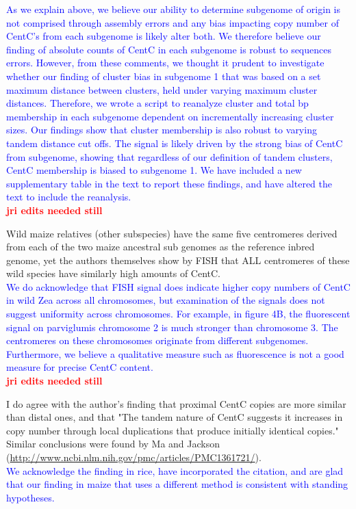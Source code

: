 \documentclass[]{article}
\newcommand{\res}[1]{\noindent \textcolor{blue}{{#1}} \\}
\newcommand{\jri}[1]{\textcolor{red}{{\bf #1}} }
\begin{document}
\res{As we explain above, we believe our ability to determine subgenome of origin is not comprised through assembly errors and any bias impacting copy number of CentC’s from each subgenome is likely alter both.  
We therefore believe our finding of absolute counts of CentC in each subgenome is robust to sequences errors.  
However, from these comments, we thought it prudent to investigate whether our finding of cluster bias in subgenome 1 that was based on a set maximum distance between clusters, held under varying maximum cluster distances.  
Therefore, we wrote a script to reanalyze cluster and total bp membership in each subgenome dependent on incrementally increasing cluster sizes.
Our findings show that cluster membership is also robust to varying tandem distance cut offs.
The signal is likely driven by the strong bias of CentC from subgenome, showing that regardless of our definition of tandem clusters, CentC membership is biased to subgenome 1.
We have included a new supplementary table in the text to report these findings, and have altered the text to include the reanalysis.}\jri{jri edits needed still}

Wild maize relatives (other subspecies) have the same five centromeres derived from each of the two maize ancestral sub genomes as the reference inbred genome, yet the authors themselves show by FISH that ALL centromeres of these wild species have similarly high amounts of CentC.\\

\res{We do acknowledge that FISH signal does indicate higher copy numbers of CentC in wild Zea across all chromosomes, but examination of the signals does not suggest uniformity across chromosomes.  
For example, in figure 4B, the fluorescent signal on parviglumis chromosome 2 is much stronger than chromosome 3.  
The centromeres on these chromosomes originate from different subgenomes.  
Furthermore, we believe a qualitative measure such as fluorescence is not a good measure for precise CentC content.} \jri{jri edits needed still}

I do agree with the author's finding that proximal CentC copies are more similar than distal ones, and that "The tandem nature of CentC suggests it increases in copy number through local duplications that produce initially identical copies." Similar conclusions were found by Ma and Jackson (\url{http://www.ncbi.nlm.nih.gov/pmc/articles/PMC1361721/}).\\

\res{We acknowledge the finding in rice, have incorporated the citation, and are glad that our finding in maize that uses a different method is consistent with standing hypotheses.}
\end{document}
